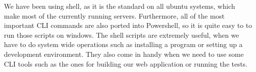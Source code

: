 We have been using shell, as it is the standard on all ubuntu systems, which make most of the currently running servers. Furthermore, all of the most important CLI commands are also ported into Powershell, so it is quite easy to to run those scripts on windows. The shell scripts are extremely useful, when we have to do system wide operations such as installing a program or setting up a development environment. They also come in handy when we need to use some CLI tools such as the ones for building our web application or running the tests.